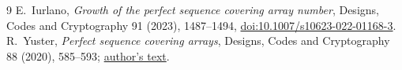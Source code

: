 \documentclass[11pt]{article}
\begin{document}
\begin{thebibliography}{9}
 E.~Iurlano, \emph{Growth of the perfect sequence
covering array number}, Designs, Codes and Cryptography 91 (2023),
1487--1494,
\href{https://doi.org/10.1007/s10623-022-01168-3}{doi:10.1007/s10623-022-01168-3}.
 R.~Yuster, \emph{Perfect sequence covering arrays},
Designs, Codes and Cryptography 88 (2020), 585--593;
\href{https://math.haifa.ac.il/raphy/papers/perfect-sca.pdf}{author's text}.
\end{thebibliography}
\end{document}
